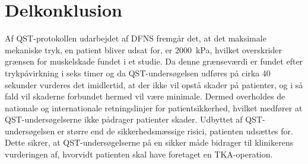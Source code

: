 \section{Delkonklusion}
Af QST-protokollen udarbejdet af DFNS fremgår det, at det maksimale mekaniske tryk, en patient bliver udsat for, er 2000~kPa, hvilket overskrider grænsen for muskelskade fundet i et studie. Da denne grænseværdi er fundet efter trykpåvirkning i seks timer og da QST-undersøgelsen udføres på cirka 40 sekunder vurderes det imidlertid, at der ikke vil opstå skader på patienter, og i så fald vil skaderne forbundet hermed vil være minimale. Dermed overholdes de nationale og internationale retningslinjer for patientsikkerhed, hvilket medfører at QST-undersøgelserne ikke pådrager patienter skader. Udbyttet af QST-undersøgelsen er større end de sikkerhedsmæssige risici, patienten udsættes for. Dette sikrer, at QST-undersøgelserne på en sikker måde bidrager til klinikerens vurderingen af, hvorvidt patienten skal have foretaget en TKA-operation.
